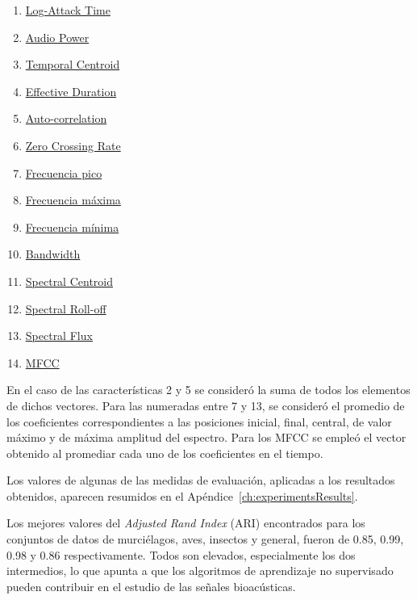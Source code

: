 \begin{multicols}{2}
    \begin{enumerate}
        \item \hyperref[subsec:log-attackTime]{Log-Attack Time}
        \item \hyperref[subsec:audioPower]{Audio Power}
        \item \hyperref[subsec:temporalCentroid]{Temporal Centroid}
        \item \hyperref[subsec:effectiveDuration]{Effective Duration}
        \item \hyperref[subsec:auto-correlation]{Auto-correlation}
        \item \hyperref[subsec:zeroCrossingRate]{Zero Crossing Rate}
        \item \hyperref[itemize:basic-spectral-features]{Frecuencia pico}
        \item \hyperref[itemize:basic-spectral-features]{Frecuencia máxima}
        \item \hyperref[itemize:basic-spectral-features]{Frecuencia mínima}
        \item \hyperref[itemize:basic-spectral-features]{Bandwidth}
        \item \hyperref[subsubsec:spectralCentroid]{Spectral Centroid}
        \item \hyperref[subsubsec:spectrallRollOff]{Spectral Roll-off}
        \item \hyperref[subsec:spectralFlux]{Spectral Flux}
        \item \hyperref[sec:MFCC]{MFCC}
    \end{enumerate}
\end{multicols}

En el caso de las características 2 y 5 se consideró la suma de todos los elementos de dichos vectores.
Para las numeradas entre 7 y 13, se consideró el promedio de los coeficientes correspondientes a las posiciones inicial, final, central, de valor máximo y de máxima amplitud del espectro.
Para los MFCC se empleó el vector obtenido al promediar cada uno de los coeficientes en el tiempo.

Los valores de algunas de las medidas de evaluación, aplicadas a los resultados obtenidos, aparecen resumidos en el Apéndice~\ref{ch:experimentsResults}.

Los mejores valores del \textit{Adjusted Rand Index} (ARI) encontrados para los conjuntos de datos de murciélagos, aves, insectos y general, fueron de 0.85, 0.99, 0.98 y 0.86 respectivamente.
Todos son elevados, especialmente los dos intermedios, lo que apunta a que los algoritmos de aprendizaje no supervisado pueden contribuir en el estudio de las señales bioacústicas.

